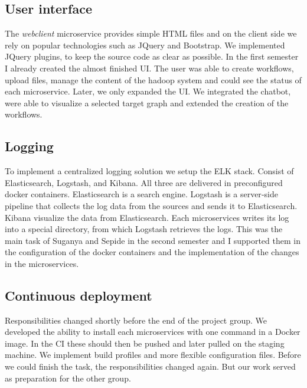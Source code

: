 \subsection{User interface}
The \textit{webclient} microservice provides simple HTML files and on the client side we rely on popular technologies such as JQuery and Bootstrap.  We implemented JQuery plugins, to keep the source code as clear as possible. In the first semester I already created the almost finished UI. The user was able to create workflows, upload files, manage the content of the hadoop system and could see the status of each microservice. Later, we only expanded the UI. We integrated the chatbot, were able to visualize a selected target graph and extended the creation of the workflows.

\subsection{Logging}
To implement a centralized logging solution we setup the ELK stack. Consist of Elasticsearch, Logstash, and Kibana. All three are delivered in preconfigured docker containers. Elasticsearch is a search engine. Logstash is a server‑side pipeline that collects the log data from the sources and sends it to Elasticsearch. Kibana visualize the data from Elasticsearch. Each microservices writes its log into a special directory, from which Logstash retrieves the logs. This was the main task of Suganya and Sepide in the second semester and I supported them in the configuration of the docker containers and the implementation of the changes in the microservices.

\subsection{Continuous deployment}
Responsibilities changed shortly before the end of the project group. We developed the ability to install each microservices with one command in a Docker image. In the CI these should then be pushed and later pulled on the staging machine. We implement build profiles and more flexible configuration files. Before we could finish the task, the responsibilities changed again. But our work served as preparation for the other group.
